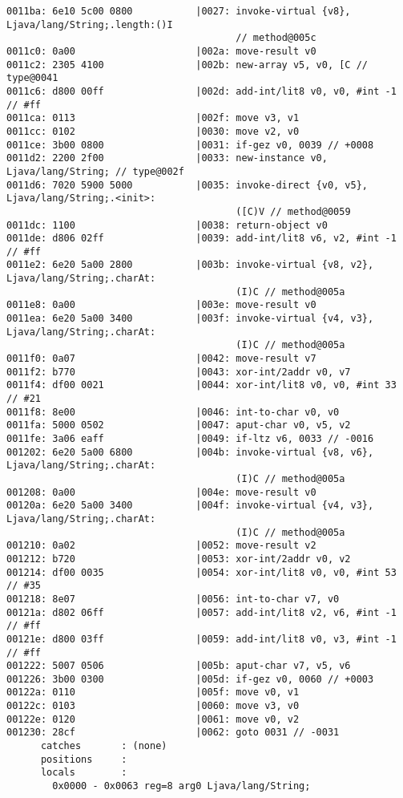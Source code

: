 \begin{lstlisting}
0011ba: 6e10 5c00 0800           |0027: invoke-virtual {v8}, Ljava/lang/String;.length:()I
                                        // method@005c
0011c0: 0a00                     |002a: move-result v0
0011c2: 2305 4100                |002b: new-array v5, v0, [C // type@0041
0011c6: d800 00ff                |002d: add-int/lit8 v0, v0, #int -1 // #ff
0011ca: 0113                     |002f: move v3, v1
0011cc: 0102                     |0030: move v2, v0
0011ce: 3b00 0800                |0031: if-gez v0, 0039 // +0008
0011d2: 2200 2f00                |0033: new-instance v0, Ljava/lang/String; // type@002f
0011d6: 7020 5900 5000           |0035: invoke-direct {v0, v5}, Ljava/lang/String;.<init>:
                                        ([C)V // method@0059
0011dc: 1100                     |0038: return-object v0
0011de: d806 02ff                |0039: add-int/lit8 v6, v2, #int -1 // #ff
0011e2: 6e20 5a00 2800           |003b: invoke-virtual {v8, v2}, Ljava/lang/String;.charAt:
                                        (I)C // method@005a
0011e8: 0a00                     |003e: move-result v0
0011ea: 6e20 5a00 3400           |003f: invoke-virtual {v4, v3}, Ljava/lang/String;.charAt:
                                        (I)C // method@005a
0011f0: 0a07                     |0042: move-result v7
0011f2: b770                     |0043: xor-int/2addr v0, v7
0011f4: df00 0021                |0044: xor-int/lit8 v0, v0, #int 33 // #21
0011f8: 8e00                     |0046: int-to-char v0, v0
0011fa: 5000 0502                |0047: aput-char v0, v5, v2
0011fe: 3a06 eaff                |0049: if-ltz v6, 0033 // -0016
001202: 6e20 5a00 6800           |004b: invoke-virtual {v8, v6}, Ljava/lang/String;.charAt:
                                        (I)C // method@005a
001208: 0a00                     |004e: move-result v0
00120a: 6e20 5a00 3400           |004f: invoke-virtual {v4, v3}, Ljava/lang/String;.charAt:
                                        (I)C // method@005a
001210: 0a02                     |0052: move-result v2
001212: b720                     |0053: xor-int/2addr v0, v2
001214: df00 0035                |0054: xor-int/lit8 v0, v0, #int 53 // #35
001218: 8e07                     |0056: int-to-char v7, v0
00121a: d802 06ff                |0057: add-int/lit8 v2, v6, #int -1 // #ff
00121e: d800 03ff                |0059: add-int/lit8 v0, v3, #int -1 // #ff
001222: 5007 0506                |005b: aput-char v7, v5, v6
001226: 3b00 0300                |005d: if-gez v0, 0060 // +0003
00122a: 0110                     |005f: move v0, v1
00122c: 0103                     |0060: move v3, v0
00122e: 0120                     |0061: move v0, v2
001230: 28cf                     |0062: goto 0031 // -0031
      catches       : (none)
      positions     :
      locals        :
        0x0000 - 0x0063 reg=8 arg0 Ljava/lang/String;


\end{lstlisting}

